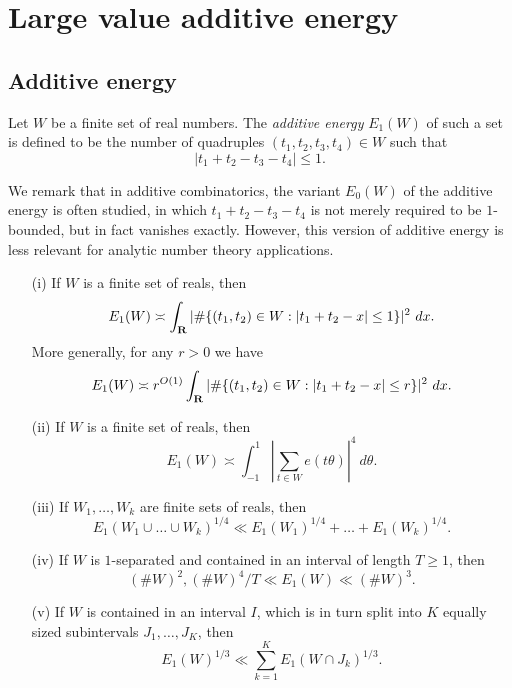 \chapter{Large value additive energy}\label{energy-chapter}

\section{Additive energy}

\begin{definition}\label{energy-def}  Let $W$ be a finite set of real numbers.  The \emph{additive energy} $E_1(W)$ of such a set is defined to be the number of quadruples $(t_1,t_2,t_3,t_4) \in W$ such that
$$
|t_1 + t_2 - t_3 - t_4| \leq 1.$$
\end{definition}

We remark that in additive combinatorics, the variant $E_0(W)$ of the additive energy is often studied, in which $t_1+t_2-t_3-t_4$ is not merely required to be $1$-bounded, but in fact vanishes exactly.  However, this version of additive energy is less relevant for analytic number theory applications.

\begin{lemma}\label{add-energy}
\begin{itemize}
\item[(i)] If $W$ is a finite set of reals, then
$$ E_1(W) \asymp \int_\R |\# \{ (t_1,t_2) \in W: |t_1+t_2 - x| \leq 1\} |^2\ dx.$$
More generally, for any $r>0$ we have
$$ E_1(W) \asymp r^{O(1)} \int_{\mathbf{R}} |\# \{ (t_1,t_2) \in W: |t_1+t_2 - x| \leq r\} |^2\ dx.$$
\item[(ii)] If $W$ is a finite set of reals, then
$$ E_1(W) \asymp \int_{-1}^1 |\sum_{t \in W} e(t\theta)|^4\ d\theta.$$
\item[(iii)] If $W_1,\dots,W_k$ are finite sets of reals, then
$$ E_1(W_1 \cup \dots \cup W_k)^{1/4} \ll E_1(W_1)^{1/4} + \dots + E_1(W_k)^{1/4}.$$
\item[(iv)]  If $W$ is $1$-separated and contained in an interval of length $T \geq 1$, then
$$ (\# W)^2, (\# W)^4/T \ll E_1(W) \ll (\# W)^3.$$
\item[(v)]  If $W$ is contained in an interval $I$, which is in turn split into $K$ equally sized subintervals $J_1,\dots,J_K$, then
$$ E_1(W)^{1/3} \ll \sum_{k=1}^K E_1(W \cap J_k)^{1/3}.$$
\end{itemize}
\end{lemma}

